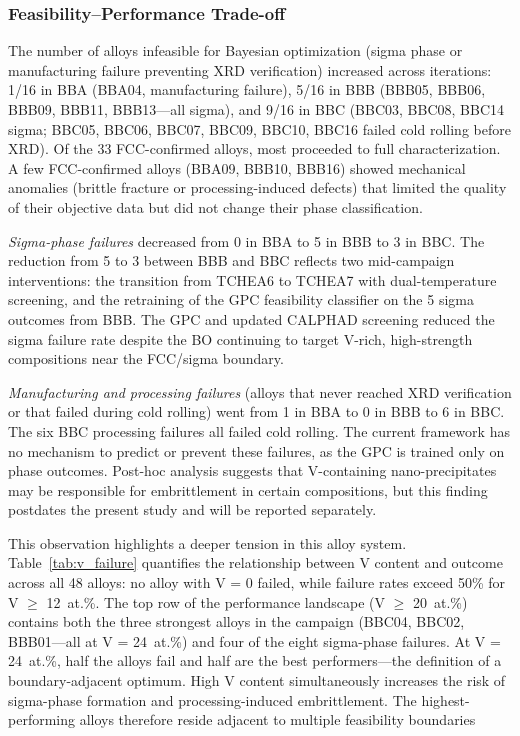 \subsubsection{Feasibility--Performance Trade-off}

The number of alloys infeasible for Bayesian optimization (sigma phase or manufacturing failure preventing XRD verification) increased across iterations: 1/16 in BBA (BBA04, manufacturing failure), 5/16 in BBB (BBB05, BBB06, BBB09, BBB11, BBB13---all sigma), and 9/16 in BBC (BBC03, BBC08, BBC14 sigma; BBC05, BBC06, BBC07, BBC09, BBC10, BBC16 failed cold rolling before XRD). Of the 33 FCC-confirmed alloys, most proceeded to full characterization. A few FCC-confirmed alloys (BBA09, BBB10, BBB16) showed mechanical anomalies (brittle fracture or processing-induced defects) that limited the quality of their objective data but did not change their phase classification.

\emph{Sigma-phase failures} decreased from 0 in BBA to 5 in BBB to 3 in BBC. The reduction from 5 to 3 between BBB and BBC reflects two mid-campaign interventions: the transition from TCHEA6 to TCHEA7 with dual-temperature screening, and the retraining of the GPC feasibility classifier on the 5 sigma outcomes from BBB. The GPC and updated CALPHAD screening reduced the sigma failure rate despite the BO continuing to target V-rich, high-strength compositions near the FCC/sigma boundary.

\emph{Manufacturing and processing failures} (alloys that never reached XRD verification or that failed during cold rolling) went from 1 in BBA to 0 in BBB to 6 in BBC. The six BBC processing failures all failed cold rolling. The current framework has no mechanism to predict or prevent these failures, as the GPC is trained only on phase outcomes. Post-hoc analysis suggests that V-containing nano-precipitates may be responsible for embrittlement in certain compositions, but this finding postdates the present study and will be reported separately.

This observation highlights a deeper tension in this alloy system. Table~\ref{tab:v_failure} quantifies the relationship between V content and outcome across all 48 alloys: no alloy with V = 0 failed, while failure rates exceed 50\% for V $\geq$ 12~at.\%. The top row of the performance landscape (V $\geq$ 20~at.\%) contains both the three strongest alloys in the campaign (BBC04, BBC02, BBB01---all at V = 24~at.\%) and four of the eight sigma-phase failures. At V = 24~at.\%, half the alloys fail and half are the best performers---the definition of a boundary-adjacent optimum. High V content simultaneously increases the risk of sigma-phase formation and processing-induced embrittlement. The highest-performing alloys therefore reside adjacent to multiple feasibility boundaries

